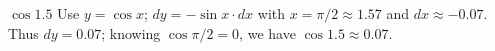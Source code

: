 {$\cos 1.5$
}
{Use $y = \cos x$; $dy = -\sin x\cdot dx$ with $x=\pi/2\approx 1.57$ and $dx \approx -0.07$. Thus $dy = 0.07$; knowing $\cos \pi/2 = 0$, we have $\cos 1.5 \approx 0.07$.
}

